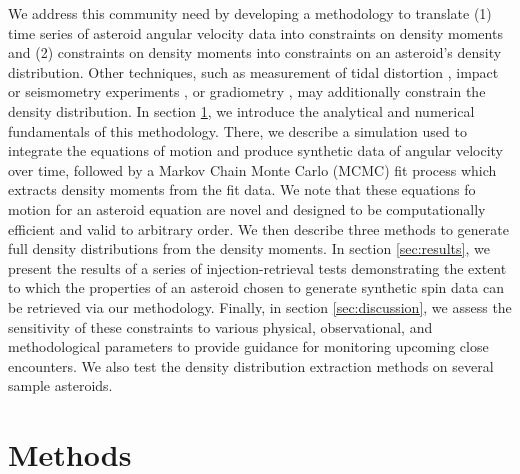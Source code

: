\documentclass[fleqn,usenatbib]{mnras}
\begin{document}
We address this community need by developing a methodology to translate (1) time series of asteroid angular velocity data into constraints on density moments and (2) constraints on density moments into constraints on an asteroid's density distribution. Other techniques, such as measurement of tidal distortion \cite{RICHARDSON199847}, impact or seismometry experiments \cite{RICHARDSON2005325}, or gradiometry \cite{carroll2018tidal}, may additionally constrain the density distribution. In section \ref{sec:methods}, we introduce the analytical and numerical fundamentals of this methodology. There, we describe a simulation used to integrate the equations of motion and produce synthetic data of angular velocity over time, followed by a Markov Chain Monte Carlo (MCMC) fit process which  extracts density moments from the fit data. We note that these equations fo motion for an asteroid equation are novel and designed to be computationally efficient and valid to arbitrary order. We then describe three methods to generate full density distributions from the density moments. In section \ref{sec:results}, we present the results of a series of injection-retrieval tests demonstrating the extent to which the properties of an asteroid chosen to generate synthetic spin data can be retrieved via our methodology. Finally, in section \ref{sec:discussion}, we assess the sensitivity of these constraints to various physical, observational, and methodological parameters to provide guidance for monitoring upcoming close encounters. We also test the density distribution extraction methods on several sample asteroids.





\section{Methods}
\label{sec:methods}
\end{document}
